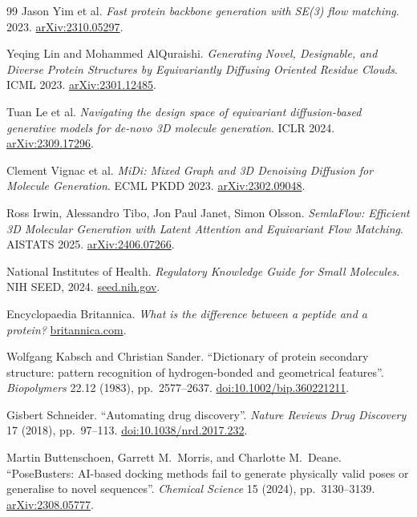 \documentclass[12pt,a4paper,twoside]{report}
\begin{document}
\begin{thebibliography}{99}
Jason Yim et al.
\textit{Fast protein backbone generation with SE(3) flow matching}. 2023.
\href{https://arxiv.org/abs/2310.05297}{arXiv:2310.05297}.

Yeqing Lin and Mohammed AlQuraishi.
\textit{Generating Novel, Designable, and Diverse Protein Structures by Equivariantly Diffusing Oriented Residue Clouds}. ICML 2023.
\href{https://arxiv.org/abs/2301.12485}{arXiv:2301.12485}.

Tuan Le et al.
\textit{Navigating the design space of equivariant diffusion-based generative models for de-novo 3D molecule generation}. ICLR 2024.
\href{https://arxiv.org/abs/2309.17296}{arXiv:2309.17296}.

Clement Vignac et al.
\textit{MiDi: Mixed Graph and 3D Denoising Diffusion for Molecule Generation}. ECML PKDD 2023.
\href{https://arxiv.org/abs/2302.09048}{arXiv:2302.09048}.

Ross Irwin, Alessandro Tibo, Jon Paul Janet, Simon Olsson.
\textit{SemlaFlow: Efficient 3D Molecular Generation with Latent Attention and Equivariant Flow Matching}. AISTATS 2025.
\href{https://arxiv.org/abs/2406.07266}{arXiv:2406.07266}.

National Institutes of Health.
\textit{Regulatory Knowledge Guide for Small Molecules}. NIH SEED, 2024.
\href{https://seed.nih.gov/sites/default/files/2024-03/Regulatory-Knowledge-Guide-for-Small-Molecules.pdf}{seed.nih.gov}.

Encyclopaedia Britannica.
\textit{What is the difference between a peptide and a protein?}
\href{https://www.britannica.com/story/what-is-the-difference-between-a-peptide-and-a-protein}{britannica.com}.

Wolfgang Kabsch and Christian Sander.
``Dictionary of protein secondary structure: pattern recognition of hydrogen-bonded and geometrical features''.
\textit{Biopolymers} 22.12 (1983), pp.~2577--2637.
\href{https://doi.org/10.1002/bip.360221211}{doi:10.1002/bip.360221211}.

Gisbert Schneider.
``Automating drug discovery''.
\textit{Nature Reviews Drug Discovery} 17 (2018), pp.~97--113.
\href{https://doi.org/10.1038/nrd.2017.232}{doi:10.1038/nrd.2017.232}.

Martin Buttenschoen, Garrett M.~Morris, and Charlotte M.~Deane.
``PoseBusters: AI-based docking methods fail to generate physically valid poses or generalise to novel sequences''.
\textit{Chemical Science} 15 (2024), pp.~3130--3139.
\href{https://arxiv.org/abs/2308.05777}{arXiv:2308.05777}.


\end{thebibliography}
\end{document}
